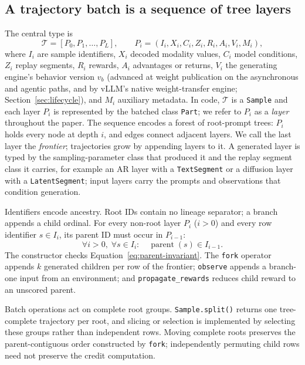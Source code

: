 \documentclass[10pt]{article}
\newcommand{\sample}{\texttt{Sample}}
\newcommand{\parttype}{\texttt{Part}}
\begin{document}
\subsection{A trajectory batch is a sequence of tree layers}
\label{sec:trajectory-layers}

The central type is
\begin{equation}
\mathcal{T} = [P_0,P_1,\ldots,P_L],
\qquad
P_i = (I_i, X_i, C_i, Z_i, R_i, A_i, V_i, M_i),
\label{eq:sample}
\end{equation}
where $I_i$ are sample identifiers, $X_i$ decoded modality values, $C_i$ model conditions, $Z_i$ replay segments, $R_i$ rewards, $A_i$ advantages or returns, $V_i$ the generating engine's behavior version $v_b$ (advanced at weight publication on the asynchronous and agentic paths, and by vLLM's native weight-transfer engine; Section~\ref{sec:lifecycle}), and $M_i$ auxiliary metadata.
In code, $\mathcal{T}$ is a \sample{} and each layer $P_i$ is represented by the batched class \parttype{}; we refer to $P_i$ as a \emph{layer} throughout the paper.
The sequence encodes a forest of root-prompt trees: $P_i$ holds every node at depth $i$, and edges connect adjacent layers.
We call the last layer the \emph{frontier}; trajectories grow by appending layers to it.
A generated layer is typed by the sampling-parameter class that produced it and the replay segment class it carries, for example an AR layer with a \texttt{TextSegment} or a diffusion layer with a \texttt{LatentSegment}; input layers carry the prompts and observations that condition generation.

Identifiers encode ancestry.
Root IDs contain no lineage separator; a branch appends a child ordinal.
For every non-root layer $P_i$ ($i>0$) and every row identifier $s\in I_i$, its parent ID must occur in $P_{i-1}$:
\begin{equation}
\forall i>0,\;\forall s\in I_i:\quad \operatorname{parent}(s)\in I_{i-1}.
\label{eq:parent-invariant}
\end{equation}
The constructor checks Equation~\ref{eq:parent-invariant}.
The \texttt{fork} operator appends $k$ generated children per row of the frontier; \texttt{observe} appends a branch-one input from an environment; and \texttt{propagate\_rewards} reduces child reward to an unscored parent.

Batch operations act on complete root groups.
\texttt{Sample.split()} returns one tree-complete trajectory per root, and slicing or selection is implemented by selecting these groups rather than independent rows.
Moving complete roots preserves the parent-contiguous order constructed by \texttt{fork}; independently permuting child rows need not preserve the credit computation.
\end{document}
